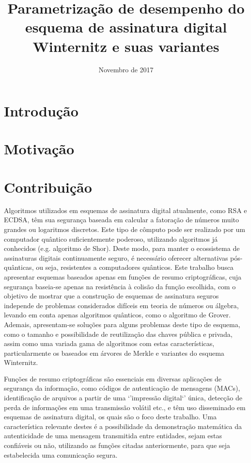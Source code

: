 \documentclass[12pt]{article}
\title{Parametrização de desempenho do esquema de assinatura digital Winternitz e suas variantes}
\author{Novembro de 2017}
\date{}
\begin{document}
\maketitle

\section{Introdução}



\section{Motivação}

\section{Contribuição}

Algoritmos utilizados em esquemas de assinatura digital atualmente, como RSA
e ECDSA, têm sua segurança baseada em calcular a fatoração de números muito
grandes ou logaritmos discretos. Este tipo de cômputo pode ser realizado por
um computador quântico suficientemente poderoso, utilizando algoritmos já
conhecidos (e.g. algoritmo de Shor). Deste modo, para manter o ecossistema de
assinaturas digitais continuamente seguro, é necessário oferecer alternativas
pós-quânticas, ou seja, resistentes a computadores quânticos. Este trabalho
busca apresentar esquemas baseados apenas em funções de resumo
criptográficas, cuja segurança baseia-se apenas na resistência à colisão da
função escolhida, com o objetivo de mostrar que a construção de esquemas de
assinatura seguros independe de problemas considerados difíceis em teoria de
números ou álgebra, levando em conta apenas algoritmos quânticos, como o
algoritmo de Grover. Ademais, apresentam-se soluções para alguns problemas
deste tipo de esquema, como o tamanho e possibilidade de reutilização das
chaves pública e privada, assim como uma variada gama de algoritmos com estas
características, particularmente os baseados em árvores de Merkle e variantes
do esquema Winternitz.

Funções de resumo criptográficas são essenciais em diversas aplicações de
segurança da informação, como códigos de autenticação de mensagens (MACs),
identificação de arquivos a partir de uma `'impressão digital`' única, detecção
de perda de informações em uma transmissão volátil etc., e têm uso disseminado
em esquemas de assinatura digital, os quais são o foco deste trabalho. Uma
característica relevante destes é a possibilidade da demonstração matemática da
autenticidade de uma mensagem transmitida entre entidades, sejam estas
confiáveis ou não, utilizando as funções citadas anteriormente, para que seja
estabelecida uma comunicação segura.
\end{document}

